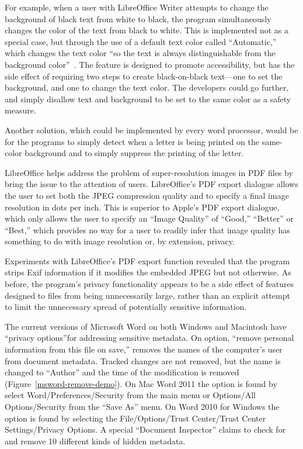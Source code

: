 For example, when a user with LibreOffice Writer  attempts to change the
background of black text from white to black, the program
simultaneously changes the color of the text from black to
white. This is implemented not as a special case, but through the use
of a default text color called ``Automatic,'' which changes the text
color ``so the text is always distinguishable from the background
color''~\cite{libreoffice-accessibility}. The feature is designed to
promote accessibility, but has the side effect of requiring two steps
to create black-on-black text---one to set the background, and one to
change the text color. The developers could go further, and simply
disallow text and background to be set to the same color as a safety
measure.

Another solution, which could be implemented by every word processor,
would be for the programs to simply detect when a letter is being printed on the
same-color background and to simply suppress the printing of the letter.

LibreOffice helps address the problem of super-resolution images in
PDF files by bring the issue to the attention of users. 
LibreOffice's PDF export dialogue allows the user to set both the JPEG
compression quality and to specify a final image resolution in dots
per inch. This is superior to
Apple's PDF export dialogue, which only allows the user to specify
an ``Image Quality'' of ``Good,'' ``Better'' or ``Best,'' which provides no way for a user to readily
infer that image quality has something to do with image resolution or,
by extension, privacy.

Experiments with LibreOffice's PDF export function revealed that the
program strips Exif information if it modifies the embedded JPEG but
not otherwise. As before, the program's privacy functionality appears to
be a side effect of features designed to files from being
unnecessarily large, rather than an explicit attempt to limit the
unnecessary spread of potentially sensitive information. 

The current versions of Microsoft Word on both Windows and Macintosh
have ``privacy options''for addressing sensitive metadata. On
option, ``remove personal information from this file on save,''
removes the names of the computer's user from document
metadata. Tracked changes are not removed, but the name is changed
to ``Author'' and the time of the modification is removed
(Figure~\ref{msword-remove-demo}). On Mac Word 2011 the option is found by
select Word/Preferences/Security from the main menu or Options/All
Options/Security from the ``Save As'' menu. On Word 2010 for Windows
the option is found by selecting the File/Options/Trust Center/Trust
Center Settings/Privacy Options. A special ``Document Inspector''
claims to check for and remove 10 different kinds of hidden
metadata. 

